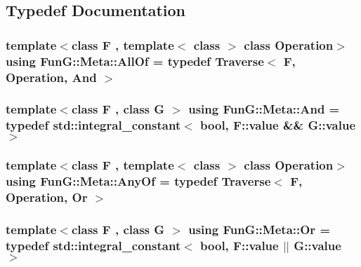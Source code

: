 \subsection{Typedef Documentation}
\hypertarget{namespaceFunG_1_1Meta_aa62ce805a20b342ffc1947c210be3501}{
\subsubsection[{All\-Of}]{\setlength{\rightskip}{0pt plus 5cm}template$<$class F , template$<$ class $>$ class Operation$>$ using {\bf Fun\-G\-::\-Meta\-::\-All\-Of} = typedef {\bf Traverse}$<$ F, Operation, {\bf And} $>$}}\label{namespaceFunG_1_1Meta_aa62ce805a20b342ffc1947c210be3501}
\hypertarget{namespaceFunG_1_1Meta_a6f0fce21e31ab8fdc307eddead3b8d66}{
\subsubsection[{And}]{\setlength{\rightskip}{0pt plus 5cm}template$<$class F , class G $>$ using {\bf Fun\-G\-::\-Meta\-::\-And} = typedef std\-::integral\-\_\-constant$<$ bool, F\-::value \&\& G\-::value $>$}}\label{namespaceFunG_1_1Meta_a6f0fce21e31ab8fdc307eddead3b8d66}
\hypertarget{namespaceFunG_1_1Meta_a54a94493bb1caa42606dd7e6744abf8c}{
\subsubsection[{Any\-Of}]{\setlength{\rightskip}{0pt plus 5cm}template$<$class F , template$<$ class $>$ class Operation$>$ using {\bf Fun\-G\-::\-Meta\-::\-Any\-Of} = typedef {\bf Traverse}$<$ F, Operation, {\bf Or} $>$}}\label{namespaceFunG_1_1Meta_a54a94493bb1caa42606dd7e6744abf8c}
\hypertarget{namespaceFunG_1_1Meta_a54cebc5541fa7677e239a9b7a84aba7e}{
\subsubsection[{Or}]{\setlength{\rightskip}{0pt plus 5cm}template$<$class F , class G $>$ using {\bf Fun\-G\-::\-Meta\-::\-Or} = typedef std\-::integral\-\_\-constant$<$ bool, F\-::value $\vert$$\vert$ G\-::value $>$}}\label{namespaceFunG_1_1Meta_a54cebc5541fa7677e239a9b7a84aba7e}
